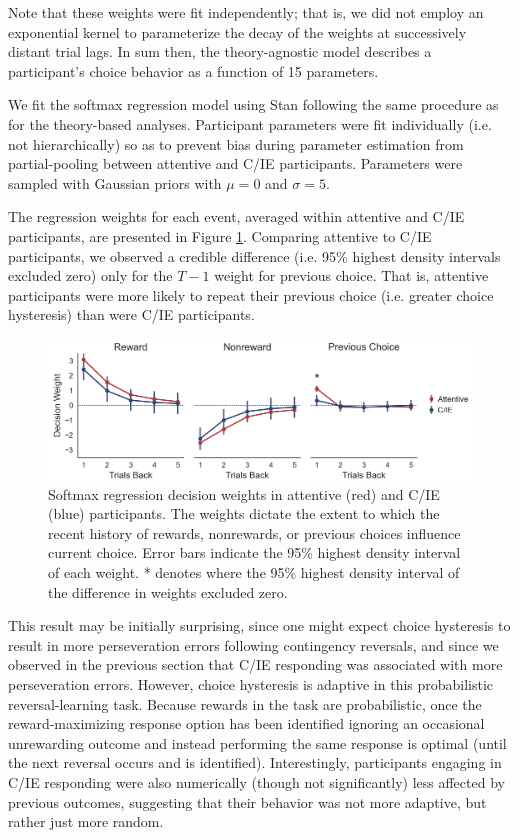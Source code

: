 \documentclass[a4paper,notitlepage,12pt]{article}
\begin{document}
\begin{refsection}[supp]
Note that these weights were fit independently; that is, we did not employ an exponential kernel to parameterize the decay of the weights at successively distant trial lags. In sum then, the theory-agnostic model describes a participant's choice behavior as a function of 15 parameters. 

We fit the softmax regression model using Stan following the same procedure as for the theory-based analyses. Participant parameters were fit individually (i.e. not hierarchically)  so as to prevent bias during parameter estimation from partial-pooling between attentive and C/IE participants. Parameters were sampled with Gaussian priors with $\mu = 0$ and $\sigma = 5$.

The regression weights for each event, averaged within attentive and C/IE participants, are presented in Figure \ref{fig:regression}. Comparing attentive to C/IE participants, we observed a credible difference (i.e. 95\% highest density intervals excluded zero) only for the $T-1$ weight for previous choice. That is, attentive participants were more likely to repeat their previous choice (i.e. greater choice hysteresis) than were C/IE participants.

\begin{figure}[!t]
\includegraphics[width=16cm]{../figures/main_03c.png}
\centering
\captionsetup{width=0.88\textwidth}
\caption{Softmax regression decision weights in attentive (red) and C/IE (blue) participants. The weights dictate the extent to which the recent history of rewards, nonrewards, or previous choices influence current choice. Error bars indicate the 95\% highest density interval of each weight. * denotes where the 95\% highest density interval of the difference in weights excluded zero.}
\label{fig:regression}
\end{figure}

This result may be initially surprising, since one might expect choice hysteresis to result in more perseveration errors following contingency reversals, and since we observed in the previous section that C/IE responding was associated with more perseveration errors. However, choice hysteresis is adaptive in this probabilistic reversal-learning task. Because rewards in the task are probabilistic, once the reward-maximizing response option has been identified ignoring an occasional unrewarding outcome and instead performing the same response is optimal (until the next reversal occurs and is identified). Interestingly, participants engaging in C/IE responding were also numerically (though not significantly) less affected by previous outcomes, suggesting that their behavior was not more adaptive, but rather just more random.


\end{refsection}
\end{document}
